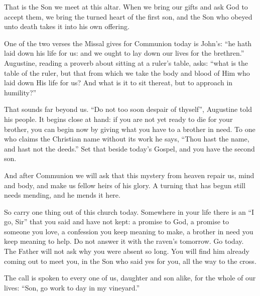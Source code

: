 \bigskip

That is the Son we meet at this altar. When we bring our gifts and ask God to
accept them, we bring the turned heart of the first son, and the Son who
obeyed unto death takes it into his own offering.

One of the two verses the Missal gives for Communion today is John's: ``he
hath laid down his life for us: and we ought to lay down our lives for the
brethren.'' Augustine, reading a proverb about sitting at a ruler's table,
asks: ``what is the table of the ruler, but that from which we take the body
and blood of Him who laid down His life for us? And what is it to sit thereat,
but to approach in humility?''

That sounds far beyond us. ``Do not too soon despair of thyself'', Augustine
told his people. It begins close at hand: if you are not yet ready to die for
your brother, you can begin now by giving what you have to a brother in need.
To one who claims the Christian name without its work he says,
``Thou hast the name, and hast not the deeds.'' Set that beside today's
Gospel, and you have the second son.

And after Communion we will ask that this mystery from heaven repair us, mind
and body, and make us fellow heirs of his glory. A turning that has begun
still needs mending, and he mends it here.

\bigskip

So carry one thing out of this church today. Somewhere in your life there is
an ``I go, Sir'' that you said and have not kept: a promise to God, a promise
to someone you love, a confession you keep meaning to make, a brother in need
you keep meaning to help. Do not answer it with the raven's tomorrow. Go
today. The Father will not ask why you were absent so long. You will find him
already coming out to meet you, in the Son who said yes for you, all the way
to the cross.

The call is spoken to every one of us, daughter and son alike, for the whole
of our lives: ``Son, go work to day in my vineyard.''

